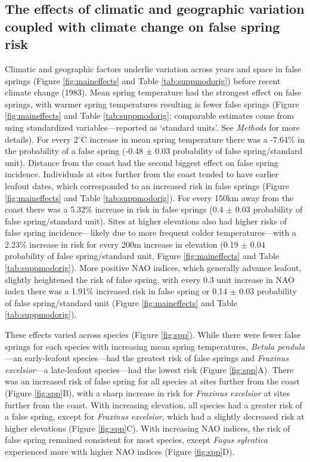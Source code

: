 \documentclass{article}\usepackage[]{graphicx}\usepackage[]{color}
\begin{document}

\subsection*{The effects of climatic and geographic variation coupled with climate change on false spring risk}
Climatic and geographic factors underlie variation across years and space in false springs (Figure \ref{fig:maineffects} and Table \ref{tab:suppmodorig}) before recent climate change (1983). Mean spring temperature had the strongest effect on false springs, with warmer spring temperatures resulting is fewer false springs (Figure \ref{fig:maineffects} and Table \ref{tab:suppmodorig}; comparable estimates come from using standardized variables---reported as `standard units'. See \textit{Methods} for more details). For every 2$^{\circ}$C increase in mean spring temperature there was a -7.64\% in the probability of a false spring (-0.48 $\pm$ 0.03 probability of false spring/standard unit). Distance from the coast had the second biggest effect on false spring incidence. Individuals at sites further from the coast tended to have earlier leafout dates, which corresponded to an increased risk in false springs (Figure \ref{fig:maineffects} and Table \ref{tab:suppmodorig}). For every 150km away from the coast there was a 5.32\% increase in risk in false springs (0.4 $\pm$ 0.03 probability of false spring/standard unit). Sites at higher elevations also had higher risks of false spring incidence---likely due to more frequent colder temperatures---with a 2.23\% increase in risk for every 200m increase in elevation (0.19 $\pm$ 0.04 probability of false spring/standard unit, Figure \ref{fig:maineffects} and Table \ref{tab:suppmodorig}). More positive NAO indices, which generally advance leafout, slightly heightened the risk of false spring, with every 0.3 unit increase in NAO index there was a 1.91\% increased risk in false spring or 0.14 $\pm$ 0.03 probability of false spring/standard unit (Figure \ref{fig:maineffects} and Table \ref{tab:suppmodorig}).  

These effects varied across species (Figure \ref{fig:spp}). While there were fewer false springs for each species with increasing mean spring temperatures,  \textit{Betula pendula}---an early-leafout species---had the greatest risk of false springs and \textit{Fraxinus excelsior}---a late-leafout species---had the lowest risk (Figure \ref{fig:spp}A). There was an increased risk of false spring for all species at sites further from the coast (Figure \ref{fig:spp}B), with a sharp increase in risk for \textit{Fraxinus excelsior} at sites further from the coast. With increasing elevation, all species had a greater risk of a false spring, except for \textit{Fraxinus excelsior}, which had a slightly decreased risk at higher elevations (Figure \ref{fig:spp}C).  With increasing NAO indices, the risk of false spring remained consistent for most species, except \textit{Fagus sylvatica} experienced more with higher NAO indices (Figure \ref{fig:spp}D). 
\end{document}
